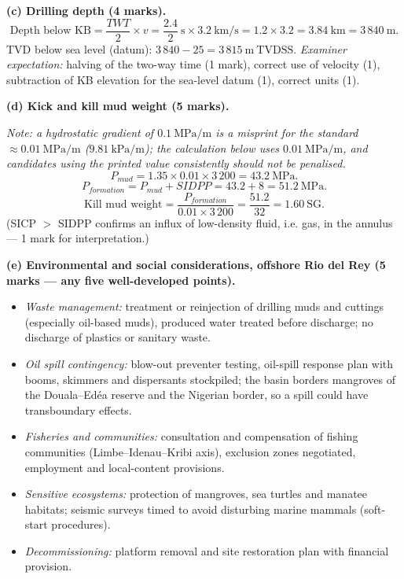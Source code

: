 \documentclass[11pt]{article}
\begin{document}
\begin{corrige}
\textbf{(c) Drilling depth (4 marks).}
\[
\text{Depth below KB} = \frac{TWT}{2}\times v = \frac{2.4}{2}\ \mathrm{s}\times 3.2\ \mathrm{km/s} = 1.2 \times 3.2 = 3.84\ \mathrm{km} = 3\,840\ \mathrm{m}.
\]
TVD below sea level (datum): $3\,840 - 25 = 3\,815\ \mathrm{m\ TVDSS}$.
\emph{Examiner expectation:} halving of the two-way time (1 mark), correct use of velocity (1), subtraction of KB elevation for the sea-level datum (1), correct units (1).

\textbf{(d) Kick and kill mud weight (5 marks).}\par
\emph{Note: a hydrostatic gradient of $0.1\ \mathrm{MPa/m}$ is a misprint for the standard $\approx 0.01\ \mathrm{MPa/m}$ ($9.81\ \mathrm{kPa/m}$); the calculation below uses $0.01\ \mathrm{MPa/m}$, and candidates using the printed value consistently should not be penalised.}
\[
P_{mud} = 1.35 \times 0.01 \times 3\,200 = 43.2\ \mathrm{MPa}.
\]
\[
P_{formation} = P_{mud} + SIDPP = 43.2 + 8 = 51.2\ \mathrm{MPa}.
\]
\[
\text{Kill mud weight} = \frac{P_{formation}}{0.01 \times 3\,200} = \frac{51.2}{32} = 1.60\ \mathrm{SG}.
\]
(SICP $>$ SIDPP confirms an influx of low-density fluid, i.e. gas, in the annulus --- 1 mark for interpretation.)

\textbf{(e) Environmental and social considerations, offshore Rio del Rey (5 marks --- any five well-developed points).}
\begin{itemize}
\item \emph{Waste management:} treatment or reinjection of drilling muds and cuttings (especially oil-based muds), produced water treated before discharge; no discharge of plastics or sanitary waste.
\item \emph{Oil spill contingency:} blow-out preventer testing, oil-spill response plan with booms, skimmers and dispersants stockpiled; the basin borders mangroves of the Douala--Ed\'ea reserve and the Nigerian border, so a spill could have transboundary effects.
\item \emph{Fisheries and communities:} consultation and compensation of fishing communities (Limbe--Idenau--Kribi axis), exclusion zones negotiated, employment and local-content provisions.
\item \emph{Sensitive ecosystems:} protection of mangroves, sea turtles and manatee habitats; seismic surveys timed to avoid disturbing marine mammals (soft-start procedures).
\item \emph{Decommissioning:} platform removal and site restoration plan with financial provision.
\end{itemize}
\end{corrige}
\end{document}
